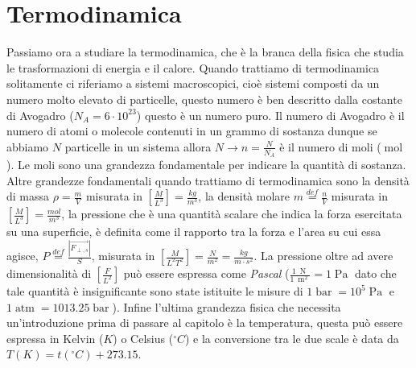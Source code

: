 \chapter{Termodinamica}

Passiamo ora a studiare la termodinamica, che è la branca della fisica che studia le trasformazioni di energia e il calore. Quando trattiamo di termodinamica solitamente ci riferiamo a sistemi macroscopici, cioè sistemi composti da un numero molto elevato di particelle, questo numero è ben descritto dalla costante di Avogadro ($N_A=6\cdot 10^{23}$) questo è un numero puro. Il numero di Avogadro è il numero di atomi o molecole contenuti in un grammo di sostanza dunque se abbiamo $N$ particelle in un sistema allora $N\rightarrow n=\frac{N}{N_A}$ è il numero di moli ($\operatorname{mol}$). Le moli sono una grandezza fondamentale per indicare la quantità di sostanza. Altre grandezze fondamentali quando trattiamo di termodinamica sono la densità di massa $\rho = \frac{m}{V}$ misurata in $\left[\frac{M}{L^3}\right]=\frac{kg}{m^3}$, la densità molare $m \stackrel{def}= \frac{n}{V}$ misurata in $\left[\frac{M}{L^3}\right]=\frac{mol}{m^3}$, la pressione che è una quantità scalare che indica la forza esercitata su una superficie, è definita come il rapporto tra la forza e l'area su cui essa agisce, $P\stackrel{def}{=}\frac{\left| \vec{F_{\perp,s}}\right|}{S}$, misurata in $\left[\frac{M}{L^2T^2}\right]=\frac{N}{m^2}=\frac{kg}{m\cdot s^2}$. La pressione oltre ad avere dimensionalità di $\left[\frac{F}{L^2}\right]$ può essere espressa come \textit{Pascal} ($\frac{1\ \operatorname{N}}{1\ \operatorname{m}^2}=1\operatorname{Pa}$ dato che tale quantità è insignificante sono state istituite le misure di $1\operatorname{bar}=10^5\operatorname{Pa}$ e $1\operatorname{atm}=1013.25\operatorname{bar}$). Infine l'ultima grandezza fisica che necessita un'introduzione prima di passare al capitolo è la temperatura, questa può essere espressa in Kelvin ($K$) o Celsius ($^{\circ}C$) e la conversione tra le due scale è data da $T(K)=t(^{\circ}C)+273.15$. 
